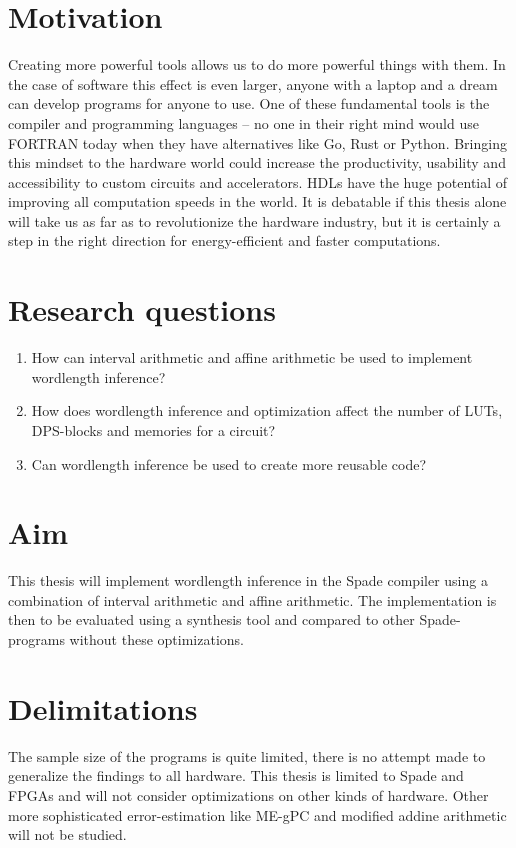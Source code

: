 \section{Motivation}
Creating more powerful tools allows us to do more powerful things with them. In the case of software this effect is even larger, anyone with a laptop and a dream can develop programs for anyone to use. One of these fundamental tools is the compiler and programming languages -- no one in their right mind would use FORTRAN today when they have alternatives like Go, Rust or Python. Bringing this mindset to the hardware world could increase the productivity, usability and accessibility to custom circuits and accelerators. HDLs have the huge potential of improving all computation speeds in the world. It is debatable if this thesis alone will take us as far as to revolutionize the hardware industry, but it is certainly a step in the right direction for energy-efficient and faster computations.

\section{Research questions}
\begin{enumerate}
  \item How can interval arithmetic and affine arithmetic be used to implement wordlength inference?
  \item How does wordlength inference and optimization affect the number of LUTs, DPS-blocks and memories for a circuit?
  \item Can wordlength inference be used to create more reusable code?
\end{enumerate}

\section{Aim}
This thesis will implement wordlength inference in the Spade compiler using a combination of interval arithmetic and affine arithmetic. The implementation is then to be evaluated using a synthesis tool and compared to other Spade-programs without these optimizations.

\section{Delimitations}
The sample size of the programs is quite limited, there is no attempt made to generalize the findings to all hardware. This thesis is limited to Spade and FPGAs and will not consider optimizations on other kinds of hardware. Other more sophisticated error-estimation like ME-gPC and modified addine arithmetic will not be studied.
